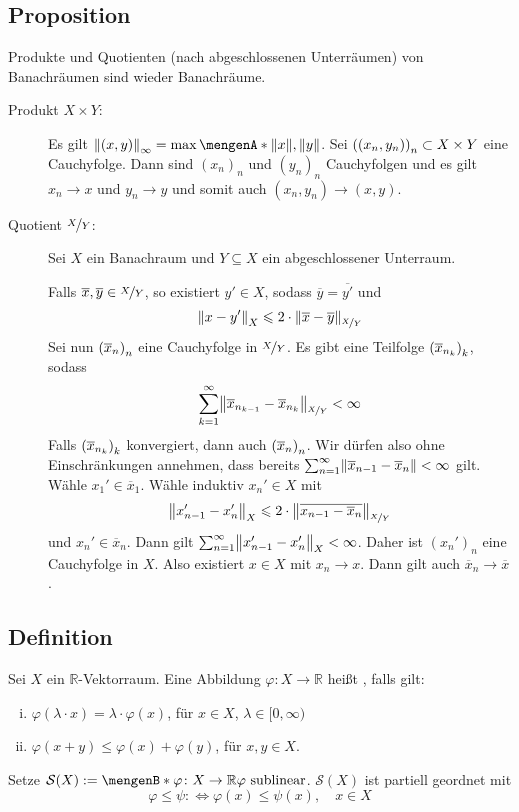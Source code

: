 \subsection[Proposition: Produkte und Quotienten von Banachräumen]{Proposition} %
\label{sub:216}
Produkte und Quotienten (nach abgeschlossenen Unterräumen) von Banachräumen sind wieder Banachräume.
\begin{description}
	\item[Produkt $X \times Y$:] Es gilt $\norm[\infty]{(x,y)} = \max \set{\norm{x}, \norm{y}}$. Sei $\enbrace*{(x_n, y_n)}_n \subset X \times Y$ eine Cauchyfolge.
	Dann sind $(x_n)_n$ und $(y_n)_n$ Cauchyfolgen und es gilt $x_n \to x$ und $y_n \to y$ und somit auch $(x_n, y_n) \to (x,y)$.
	\item[Quotient $\nicefrac{X}{Y}$:] Sei $X$ ein Banachraum und $Y \subseteq X$ ein abgeschlossener Unterraum. 
	
	Falls $\overline{x}, \overline{y} \in \nicefrac{X}{Y}$, so existiert $y' \in X$, sodass $\overline{y} = \overline{y'}$ und 
	\[
		\norm[X]{x-y'} \le 2 \cdot \norm[\nicefrac{X}{Y}]{\overline{x} - \overline{y}}  
	\] 
	Sei nun $\enbrace*{\overline{x}_n }_n$ eine Cauchyfolge in $\nicefrac{X}{Y}$. Es gibt eine Teilfolge $\enbrace*{\overline{x}_{n_k}}_k$, sodass
	\[
		\sum_{k=1}^{\infty} \norm[\nicefrac{X}{Y}]{\overline{x}_{n_{k-1}} - \overline{x}_{n_k}} < \infty 
	\]
	Falls $\enbrace*{\overline{x}_{n_k} }_k $ konvergiert, dann auch $\enbrace*{\overline{x}_n}_n$. Wir dürfen also ohne Einschränkungen annehmen, dass bereits 
	$\sum_{n=1}^{\infty} \norm{\overline{x}_{n-1} - \overline{x}_n }< \infty$ gilt. Wähle $x_1' \in \overline{x}_1$. Wähle induktiv $x_n' \in X$  mit
	\[
		\norm[X]{x_{n-1}' - x_n'} \le 2 \cdot \norm[\nicefrac{X}{Y}]{\overline{x_{n-1} - \overline{x}_n } }  
	\]
	und $x_n' \in \overline{x}_n$. Dann gilt $\sum_{n=1}^{\infty} \norm[X]{x_{n-1}' - x_n'} < \infty $. Daher ist $(x_n')_n$ eine Cauchyfolge in $X$. Also existiert 
	$x \in X$ mit $x_n \to x$. Dann gilt auch $\overline{x}_n  \to \overline{x}$. \bewende
\end{description}

\subsection[Definition: Sublineare Abbildung]{Definition} %
\label{sub:217}
Sei $X$ ein $\mathds{R}$-Vektorraum. Eine Abbildung $\varphi \colon X \to \mathds{R}$ heißt , falls gilt:
\begin{enumerate}[(i)]
	\item $\varphi(\lambda \cdot x) = \lambda \cdot \varphi(x)$, für $x \in X$, $\lambda \in [0,\infty)$
	\item $\varphi(x+y) \le \varphi(x) + \varphi(y)$, für $x,y \in X$.
\end{enumerate}
Setze $\mathcal{S}(X) := \set[\varphi \colon X \to \mathds{R}]{\varphi \text{ sublinear}}$. $\mathcal{S}(X)$ ist partiell geordnet mit 
\[
	\varphi \le \psi :\iff \varphi(x) \le \psi(x) ,\quad  x \in X
\]

